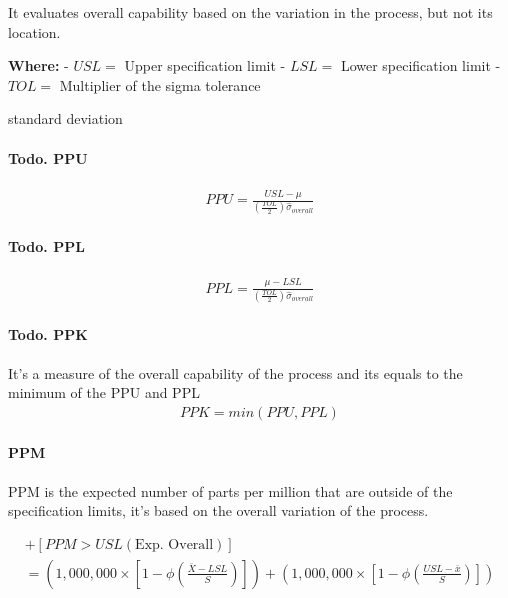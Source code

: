 \documentclass[11pt]{article}
\begin{document}
It evaluates overall capability based on the variation in the process,
but not its location.



\textbf{Where:} - \(USL =\) Upper specification limit - \(LSL =\) Lower
specification limit - \(TOL =\) Multiplier of the sigma tolerance

standard deviation

\hypertarget{todo.-ppu}{%
\paragraph{Todo. PPU}\label{todo.-ppu}}
\begin{gather}
  PPU = \frac{USL - \mu }{(\frac{TOL}{2})\hat{\sigma}_{overall}}
\end{gather}

\hypertarget{todo.-ppl}{%
\paragraph{Todo. PPL}\label{todo.-ppl}}

\begin{gather}
  PPL = \frac{\mu - LSL}{(\frac{TOL}{2})\hat{\sigma}_{overall}}
\end{gather}

\hypertarget{todo.-ppk}{%
\paragraph{Todo. PPK}\label{todo.-ppk}}

It's a measure of the overall capability of the process and its equals
to the minimum of the PPU and PPL
\begin{gather}
  PPK = min(PPU, PPL)
\end{gather}

\hypertarget{ppm}{%
\paragraph{PPM}\label{ppm}}

PPM is the expected number of parts per million that are outside of the
specification limits, it's based on the overall variation of the
process.

\begin{gather}
  [PPM < LSL(\text{Exp. Overall})] + [PPM > USL(\text{Exp. Overall})] 
  \\ = \left (1,000,000 \times \left [1 - \phi \left (\frac{\bar X - LSL}{S} \right) \right] \right) + \left (1,000,000 \times \left [1 - \phi \left(\frac{USL - \bar x}{S} \right ) \right ] \right )
\end{gather}
\end{document}
